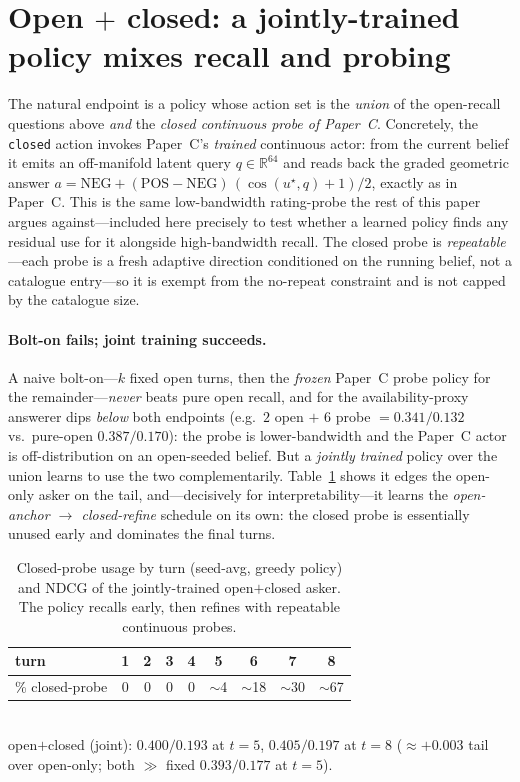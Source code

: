 \documentclass[11pt]{article}
\newcommand{\R}{\mathbb{R}}
\newcommand{\uk}{u^\star}
\begin{document}
\section{Open $+$ closed: a jointly-trained policy mixes recall and probing}
\label{sec:openclosed}
The natural endpoint is a policy whose action set is the \emph{union} of the open-recall questions above \emph{and} the
\emph{closed continuous probe of Paper~C}. Concretely, the \texttt{closed} action invokes Paper~C's \emph{trained}
continuous actor: from the current belief it emits an off-manifold latent query $q\in\R^{64}$ and reads back the graded
geometric answer $a=\mathrm{NEG}+(\mathrm{POS}-\mathrm{NEG})\,(\cos(\uk,q){+}1)/2$, exactly as in Paper~C. This is the
same low-bandwidth rating-probe the rest of this paper argues against---included here precisely to test whether a learned
policy finds any residual use for it alongside high-bandwidth recall. The closed probe is \emph{repeatable}---each probe
is a fresh adaptive direction conditioned on the running belief, not a catalogue entry---so it is exempt from the
no-repeat constraint and is not capped by the catalogue size.

\paragraph{Bolt-on fails; joint training succeeds.} A naive bolt-on---$k$ fixed open turns, then the \emph{frozen}
Paper~C probe policy for the remainder---\emph{never} beats pure open recall, and for the availability-proxy answerer dips
\emph{below} both endpoints (e.g.\ $2$ open $+$ $6$ probe $=0.341/0.132$ vs.\ pure-open $0.387/0.170$): the probe is
lower-bandwidth and the Paper~C actor is off-distribution on an open-seeded belief. But a \emph{jointly trained} policy
over the union learns to use the two complementarily. Table~\ref{tab:closedmix} shows it edges the open-only asker on
the tail, and---decisively for interpretability---it learns the \emph{open-anchor $\to$ closed-refine} schedule on its
own: the closed probe is essentially unused early and dominates the final turns.

\begin{table}[t]
\centering
\caption{Closed-probe usage by turn (seed-avg, greedy policy) and NDCG of the jointly-trained open$+$closed asker.
The policy recalls early, then refines with repeatable continuous probes.}
\label{tab:closedmix}
\begin{tabular}{lcccccccc}
\toprule
turn & 1 & 2 & 3 & 4 & 5 & 6 & 7 & 8 \\
\midrule
\% closed-probe & 0 & 0 & 0 & 0 & $\sim$4 & $\sim$18 & $\sim$30 & $\sim$67 \\
\bottomrule
\end{tabular}\\[4pt]
\small open$+$closed (joint): $0.400/0.193$ at $t{=}5$, $0.405/0.197$ at $t{=}8$ \;($\approx{+}0.003$ tail over
open-only; both $\gg$ fixed $0.393/0.177$ at $t{=}5$).
\end{table}
\end{document}
